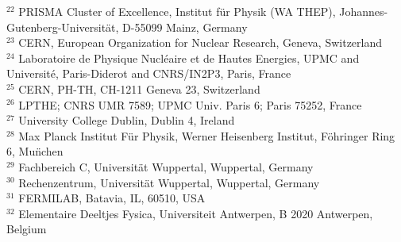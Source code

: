 { $ ^{22}$ PRISMA Cluster of Excellence, Institut f\"ur Physik (WA THEP), Johannes-Gutenberg-Universit\" at, D-55099 Mainz, Germany \\
 $ ^{23}$ CERN, European Organization for Nuclear Research, Geneva, Switzerland \\
 $ ^{24}$ Laboratoire de Physique Nucl\' eaire et de Hautes Energies, UPMC and Universit\'e, Paris-Diderot and CNRS/IN2P3, Paris, France \\
 $ ^{25}$ CERN, PH-TH, CH-1211 Geneva 23, Switzerland \\
 $ ^{26}$ LPTHE; CNRS UMR 7589; UPMC Univ. Paris 6; Paris 75252, France \\
 $ ^{27}$ University College Dublin, Dublin 4, Ireland \\
 $ ^{28}$ Max Planck Institut F\"ur Physik, Werner Heisenberg Institut, F\"ohringer Ring 6, Mu\"nchen \\
 $ ^{29}$ Fachbereich C, Universit\"at Wuppertal, Wuppertal, Germany \\
 $ ^{30}$ Rechenzentrum, Universit\"at Wuppertal, Wuppertal, Germany \\
 $ ^{31}$ FERMILAB, Batavia, IL, 60510, USA \\
 $ ^{32}$ Elementaire Deeltjes Fysica, Universiteit Antwerpen, B 2020 Antwerpen, Belgium 
}
%
